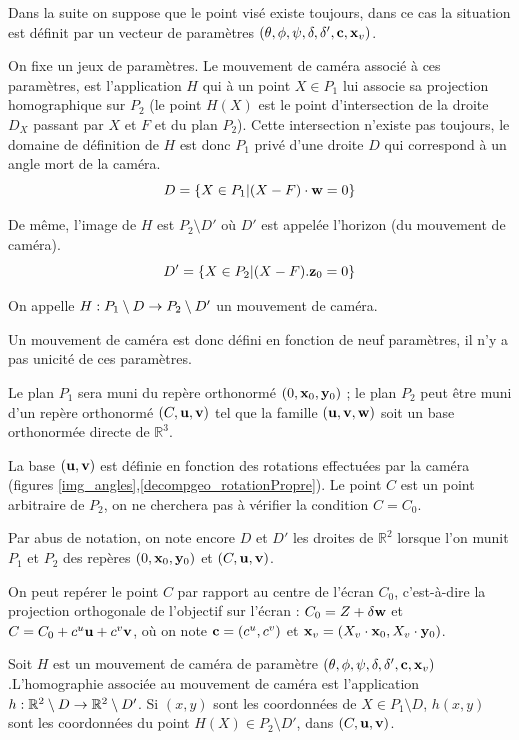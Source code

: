 Dans la suite on suppose que le point visé existe toujours, dans ce cas la situation est définit par un vecteur de paramètres
$(\theta,\phi,\psi,\delta,\delta',\mathbf{c},\mathbf{x}_v)$.\\
\begin{Def}
On fixe un jeux de paramètres. Le mouvement de caméra associé à ces paramètres, est l'application $H$ qui à un point $X\in P_{1}$ lui associe sa projection homographique sur $P_{2}$ (le point $H(X)$ est le point d'intersection de la droite $D_{X}$ passant par $X$ et $F$ et du plan $P_{2}$). Cette intersection n'existe pas toujours, le domaine de définition de $H$ est donc $P_1$ privé d'une droite $D$ qui correspond à un angle mort de la caméra.
\begin{equation*}
D=\{X\in P_1 | (X-F) \cdot \mathbf{w} =0\}
\end{equation*}

De même, l'image de $H$ est $P_2 \setminus D'$ où $D'$ est appelée l'horizon (du mouvement de caméra).
\begin{equation*}
D'=\{ X\in P_2 | (X-F).\mathbf{z}_0=0\}
\end{equation*}

On appelle $H:P_1 \setminus D \rightarrow P_2 \setminus D'$ un mouvement de caméra.
\end{Def}

Un mouvement de caméra est donc défini en fonction de neuf paramètres, il n'y a pas unicité de ces paramètres.

Le plan $P_1$ sera muni du repère orthonormé $(0,\mathbf{x}_0,\mathbf{y}_0)$ ; le plan $P_{2}$ peut être muni d'un repère orthonormé $(C,\mathbf{u},\mathbf{v})$ tel que la famille $(\mathbf{u},\mathbf{v},\mathbf{w})$ soit un base orthonormée directe de $\mathbb{R}^{3}$.

La base $(\mathbf{u},\mathbf{v})$ est définie en fonction des rotations effectuées par la caméra (figures \ref{img_angles},\ref{decompgeo_rotationPropre}). Le point $C$ est un point arbitraire de $P_2$, on ne cherchera pas à vérifier la condition $C=C_0$.

Par abus de notation, on note encore $D$ et $D'$ les droites de $\mathbb{R}^{2}$ lorsque l'on munit $P_1$ et $P_2$ des repères $(0,\mathbf{x}_0,\mathbf{y}_0)$ et $(C,\mathbf{u},\mathbf{v})$.

On peut repérer le point $C$ par rapport au centre de l'écran $C_{0}$, c'est-à-dire la projection orthogonale de l'objectif sur l'écran : $C_{0}=Z+\delta \mathbf{w}$ et $C=C_{0}+c^{u}\mathbf{u}+c^{v}\mathbf{v}$, où on note $\mathbf{c}=(c^u,c^v)$ et $\mathbf{x}_v = (X_v \cdot \mathbf{x}_0,X_v \cdot \mathbf{y}_0)$.
\begin{Def}
Soit $H$ est un mouvement de caméra de paramètre $(\theta,\phi,\psi,\delta,\delta',\mathbf{c},\mathbf{x}_v)$.L'homographie associée au mouvement de caméra est l'application $h:\mathbb{R}^{2} \setminus D \rightarrow \mathbb{R}^{2}\setminus D'$. Si $(x,y)$ sont les coordonnées de $X\in P_1\setminus D$,  $h(x,y)$ sont les coordonnées du point $H(X)\in P_2 \setminus D'$, dans $(C,\mathbf{u},\mathbf{v})$.
\end{Def}

